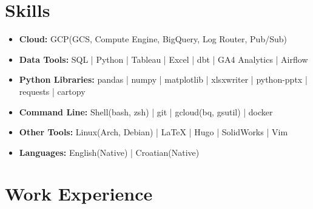 \documentclass[a4paper,9pt]{article}
\begin{document}
\section*{Skills}
\begin{itemize}
    \item[] \faCloud \hspace{1mm} \textbf{Cloud:} \hspace{16.7mm} GCP(GCS, Compute Engine, BigQuery, Log Router, Pub/Sub)
    \item[] \faTachometer \hspace{1mm} \textbf{Data Tools:} \hspace{9.5mm}  SQL | Python | Tableau | Excel | dbt | GA4 Analytics | Airflow
    \item[] \faCog \hspace{1mm} \textbf{Python Libraries:} \hspace{0.4mm} pandas | numpy | matplotlib | xlsxwriter | python-pptx | requests | cartopy
    \item[] \faTerminal \hspace{1mm} \textbf{Command Line:} \hspace{2.5mm} Shell(bash, zsh) | git |  gcloud(bq, gsutil) | docker
    \item[] \faWrench \hspace{1mm} \textbf{Other Tools:} \hspace{8mm}  Linux(Arch, Debian) |  LaTeX  | Hugo | SolidWorks | Vim
    \item[] \faLanguage \hspace{1mm} \textbf{Languages:} \hspace{9.5mm} English(Native) |  Croatian(Native)
\end{itemize}

\section*{Work Experience}
\end{document}
